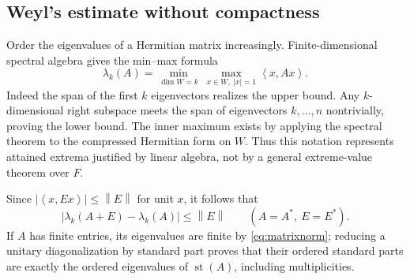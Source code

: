 \documentclass[11pt,letterpaper]{article}
\numberwithin{equation}{section}
\theoremstyle{definition}
\theoremstyle{remark}
\newcommand{\st}{\operatorname{st}}
\newcommand{\norm}[1]{\left\|#1\right\|}
\newcommand{\angles}[1]{\left\langle#1\right\rangle}
\begin{document}
\subsection{Weyl's estimate without compactness}
Order the eigenvalues of a Hermitian matrix increasingly. Finite-dimensional spectral
algebra gives the min--max formula
\[
 \lambda_k(A)=\min_{\dim W=k}\ \max_{x\in W,\ |x|=1}\angles{x,Ax}.
\]
Indeed the span of the first $k$ eigenvectors realizes the upper bound. Any $k$-dimensional
right subspace meets the span of eigenvectors $k,\ldots,n$ nontrivially, proving the lower
bound. The inner maximum exists by applying the spectral theorem to the compressed
Hermitian form on $W$. Thus this notation represents attained extrema justified by linear
algebra, not by a general extreme-value theorem over $F$.

Since $|\angles{x,Ex}|\le\norm E$ for unit $x$, it follows that
\begin{equation}\label{eq:weyl}
 |\lambda_k(A+E)-\lambda_k(A)|\le\norm E
 \qquad(A=A^*,\ E=E^*).
\end{equation}
If $A$ has finite entries, its eigenvalues are finite by \eqref{eq:matrixnorm}; reducing a
unitary diagonalization by standard part proves that their ordered standard parts are exactly
the ordered eigenvalues of $\st(A)$, including multiplicities.
\end{document}
